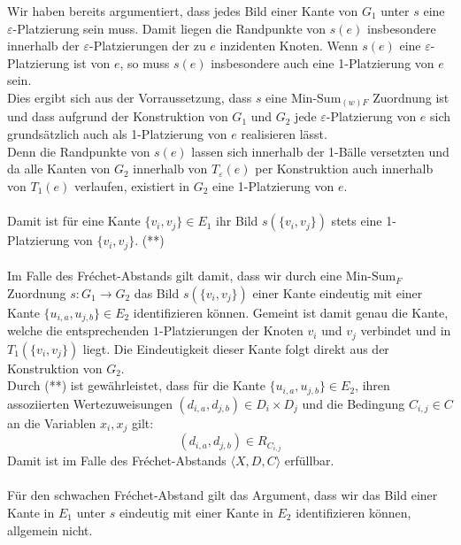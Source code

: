 \documentclass[a4paper, 12pt, twoside]{article}
\theoremstyle{Format1} %
\begin{document}
Wir haben bereits argumentiert, dass jedes Bild einer Kante von $G_1$ unter $s$ eine $\varepsilon$-Platzierung sein muss.
Damit liegen die Randpunkte von $s(e)$ insbesondere innerhalb der $\varepsilon$-Platzierungen der zu $e$ inzidenten Knoten.
Wenn $s(e)$ eine $\varepsilon$-Platzierung ist von $e$, so muss $s(e)$ insbesondere auch eine 1-Platzierung von $e$ sein.
\\
Dies ergibt sich aus der Vorraussetzung, dass $s$ eine Min-Sum$_{(w)F}$ Zuordnung ist und dass aufgrund der Konstruktion
von $G_1$ und $G_2$ jede $\varepsilon$-Platzierung von $e$ sich grundsätzlich auch als 1-Platzierung von $e$ realisieren lässt.
\\
Denn die Randpunkte von $s(e)$ lassen sich innerhalb der 1-Bälle versetzten und da alle Kanten von $G_2$ innerhalb von $T_{\varepsilon}(e)$
per Konstruktion auch innerhalb von $T_1(e)$ verlaufen, existiert in $G_2$ eine 1-Platzierung von $e$.
\\
\\
Damit ist für eine Kante $\{v_i, v_j\} \in E_1$ ihr Bild $s(\{v_i, v_j\})$ stets eine 1-Platzierung von $\{v_i, v_j\}$. (**)
\\
\\
Im Falle des Fréchet-Abstands gilt damit, dass wir durch eine $\text{Min-Sum}_F$ Zuordnung $s: G_1 \to G_2$ das Bild $s(\{v_i, v_j\})$ einer Kante
eindeutig mit einer Kante $\{u_{i,a}, u_{j,b}\} \in E_2$ identifizieren können. Gemeint ist damit genau die Kante, welche
die entsprechenden $1$-Platzierungen der Knoten $v_i$ und $v_j$ verbindet und in $T_1(\{v_i, v_j\})$ liegt. Die Eindeutigkeit dieser Kante folgt direkt aus der
Konstruktion von $G_2$.
\\
Durch (**) ist gewährleistet, dass für die Kante $\{u_{i,a}, u_{j,b}\} \in E_2$, ihren assoziierten Wertezuweisungen $(d_{i,a}, d_{j,b}) \in D_i \times D_j$
und die Bedingung $C_{i,j} \in C$ an die Variablen $x_i, x_j$ gilt:
$$(d_{i,a},d_{j,b}) \in R_{C_{i,j}}$$
Damit ist im Falle des Fréchet-Abstands $\langle X,D,C \rangle$ erfüllbar.
\\
\\
Für den schwachen Fréchet-Abstand gilt das Argument, dass wir das Bild einer Kante in $E_1$ unter $s$ eindeutig mit einer Kante in $E_2$ identifizieren können, allgemein nicht.
\end{document}
